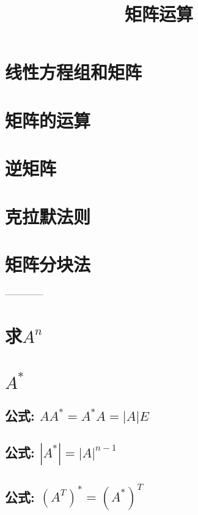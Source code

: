 \documentclass[UTF8]{ctexart}
\title{矩阵运算}
\begin{document}
	\tableofcontents %
	\date{} %
	\maketitle  %
	
	
	\section{线性方程组和矩阵}
	
	\section{矩阵的运算}
	
	\section{逆矩阵}
	
	\section{克拉默法则}
	
	\section{矩阵分块法}
	
	--------------
	
	
	
	\section{求$A^n$}
	
	
	\section{$A^*$}
	

		\subsection{公式: $AA^*=A^*A=\left| A \right|E			$} 
		

		\subsection{公式: $\left| A^* \right|=\left| A \right|^{n-1}			$} 
		

		\subsection{公式: $\left( A^T \right) ^*=\left( A^* \right) ^T			$} 
		
\end{document}
